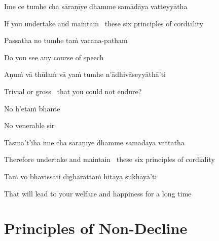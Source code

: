 \begin{pali-hang}
Ime ce tumhe cha sāraṇīye dhamme samādāya vatteyyātha
\end{pali-hang}

\begin{english-hang}
  If you undertake and maintain \breathmark\ these six principles of cordiality
\end{english-hang}

\ifninebythirteen\clearpage\fi

Passatha no tumhe taṁ vacana-pathaṁ

\begin{english}
  Do you see any course of speech
\end{english}

Aṇuṁ vā thūlaṁ vā yaṁ tumhe n'ādhivāseyyāthā'ti

\begin{english}
  Trivial or gross \breathmark\ that you could not endure?
\end{english}

\ifafive\fi

No h'etaṁ bhante

\begin{english}
  No venerable sir
\end{english}

\begin{pali-hang}
Tasmā't'iha ime cha sāraṇīye dhamme samādāya vattatha
\end{pali-hang}

\begin{english-hang}
  Therefore undertake and maintain \breathmark\ these six principles of cordiality
\end{english-hang}

Taṁ vo bhavissati dīgharattaṁ hitāya sukhāyā'ti

\begin{english-hang}
  That will lead to your welfare and happiness for a long time
\end{english-hang}

\suttaRef{[MN 104]}

\ifdigital{}\fi



\section{Principles of Non-Decline}
\label{principles-of-non-decline}

